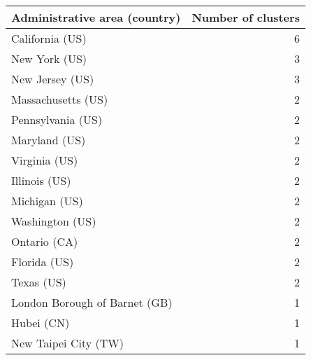 \begin{tabular}{lr}
\toprule
 Administrative area (country) &  Number of clusters \\
\midrule
               California (US) &                   6 \\
                 New York (US) &                   3 \\
               New Jersey (US) &                   3 \\
            Massachusetts (US) &                   2 \\
             Pennsylvania (US) &                   2 \\
                 Maryland (US) &                   2 \\
                 Virginia (US) &                   2 \\
                 Illinois (US) &                   2 \\
                 Michigan (US) &                   2 \\
               Washington (US) &                   2 \\
                  Ontario (CA) &                   2 \\
                  Florida (US) &                   2 \\
                    Texas (US) &                   2 \\
 London Borough of Barnet (GB) &                   1 \\
                    Hubei (CN) &                   1 \\
          New Taipei City (TW) &                   1 \\
\bottomrule
\end{tabular}
